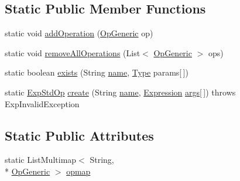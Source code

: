 \subsection*{Static Public Member Functions}
\begin{DoxyCompactItemize}
\item 
static void \hyperlink{classorg_1_1tzi_1_1use_1_1uml_1_1ocl_1_1expr_1_1_exp_std_op_a72b9c6973e4babcd614ecb51a055e582}{add\-Operation} (\hyperlink{classorg_1_1tzi_1_1use_1_1uml_1_1ocl_1_1expr_1_1operations_1_1_op_generic}{Op\-Generic} op)
\item 
static void \hyperlink{classorg_1_1tzi_1_1use_1_1uml_1_1ocl_1_1expr_1_1_exp_std_op_a38d8efd0a7c0c8cbb18001954c2a38ea}{remove\-All\-Operations} (List$<$ \hyperlink{classorg_1_1tzi_1_1use_1_1uml_1_1ocl_1_1expr_1_1operations_1_1_op_generic}{Op\-Generic} $>$ ops)
\item 
static boolean \hyperlink{classorg_1_1tzi_1_1use_1_1uml_1_1ocl_1_1expr_1_1_exp_std_op_aa382ebbf76569761a70d7f947e07e758}{exists} (String \hyperlink{classorg_1_1tzi_1_1use_1_1uml_1_1ocl_1_1expr_1_1_exp_std_op_adf3a0a06fa248affedc13e555ee040fa}{name}, \hyperlink{interfaceorg_1_1tzi_1_1use_1_1uml_1_1ocl_1_1type_1_1_type}{Type} params\mbox{[}$\,$\mbox{]})
\item 
static \hyperlink{classorg_1_1tzi_1_1use_1_1uml_1_1ocl_1_1expr_1_1_exp_std_op}{Exp\-Std\-Op} \hyperlink{classorg_1_1tzi_1_1use_1_1uml_1_1ocl_1_1expr_1_1_exp_std_op_a30ffc21cc04c915d409db3ecf3346b81}{create} (String \hyperlink{classorg_1_1tzi_1_1use_1_1uml_1_1ocl_1_1expr_1_1_exp_std_op_adf3a0a06fa248affedc13e555ee040fa}{name}, \hyperlink{classorg_1_1tzi_1_1use_1_1uml_1_1ocl_1_1expr_1_1_expression}{Expression} \hyperlink{classorg_1_1tzi_1_1use_1_1uml_1_1ocl_1_1expr_1_1_exp_std_op_a7480d81e23761f17d031c8225e34119d}{args}\mbox{[}$\,$\mbox{]})  throws Exp\-Invalid\-Exception 
\end{DoxyCompactItemize}
\subsection*{Static Public Attributes}
\begin{DoxyCompactItemize}
\item 
static List\-Multimap$<$ String, \\*
\hyperlink{classorg_1_1tzi_1_1use_1_1uml_1_1ocl_1_1expr_1_1operations_1_1_op_generic}{Op\-Generic} $>$ \hyperlink{classorg_1_1tzi_1_1use_1_1uml_1_1ocl_1_1expr_1_1_exp_std_op_aa5af8e26688221115b96321a98918b4f}{opmap}
\end{DoxyCompactItemize}
